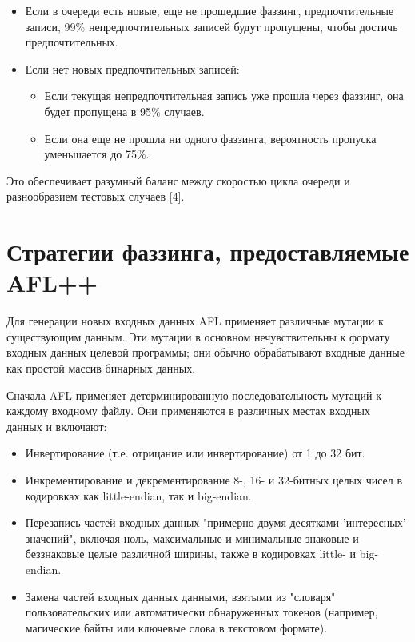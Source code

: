 \begin{itemize}
	\item Если в очереди есть новые, еще не прошедшие фаззинг, предпочтительные записи, 99\% непредпочтительных записей будут пропущены, чтобы достичь предпочтительных.
	\item Если нет новых предпочтительных записей:
	\begin{itemize}
		\item Если текущая непредпочтительная запись уже прошла через фаззинг, она будет пропущена в 95\% случаев.
		\item Если она еще не прошла ни одного фаззинга, вероятность пропуска уменьшается до 75\%.
	\end{itemize}
\end{itemize}

\par
Это обеспечивает разумный баланс между скоростью цикла очереди и разнообразием тестовых случаев [4].

\section{Стратегии фаззинга, предоставляемые AFL++} \label{ch3:sec6}

Для генерации новых входных данных AFL применяет различные мутации к существующим данным. Эти мутации в основном нечувствительны к формату входных данных целевой программы; они обычно обрабатывают входные данные как простой массив бинарных данных.

Сначала AFL применяет детерминированную последовательность мутаций к каждому входному файлу. Они применяются в различных местах входных данных и включают:
\begin{itemize}
	\item Инвертирование (т.е. отрицание или инвертирование) от 1 до 32 бит.
	\item Инкрементирование и декрементирование 8-, 16- и 32-битных целых чисел в кодировках как little-endian, так и big-endian.
	\item Перезапись частей входных данных "примерно двумя десятками 'интересных' значений", включая ноль, максимальные и минимальные знаковые и беззнаковые целые различной ширины, также в кодировках little- и big-endian.
	\item Замена частей входных данных данными, взятыми из "словаря" пользовательских или автоматически обнаруженных токенов (например, магические байты или ключевые слова в текстовом формате).
\end{itemize}

